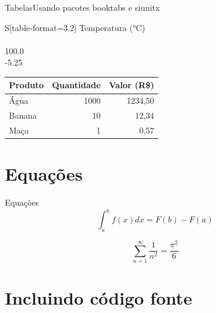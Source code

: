 \documentclass[aspectratio=169]{beamer}
\begin{document}
\begin{frame}{Tabelas}{Usando pacotes booktabs e siunitx}

    
    \begin{center}
    \begin{tabular}{S[table-format=3.2]}\toprule
        {Temperatura (\si{\celsius})} \\ \\
        100.0 \\
        -5.25 \\
        \bottomrule
    \end{tabular}
    \end{center}
    
    \begin{center}
        \begin{tabular}{l r r}\\\toprule
            Produto & Quantidade & Valor (R\$)  \\\midrule
            Água    &      1000  &  1234,50 \\ 
            Banana  &       10   &   12,34 \\
            Maça    &        1   &   0,57 \\ \bottomrule
        \end{tabular}
    \end{center}

\end{frame}


\section{Equações}



\begin{frame}{Equações}
\begin{equation}
    \int_a^b f(x) dx = F(b) - F(a)
\end{equation}

\begin{equation}
    \sum_{n=1}^{\infty} \frac{1}{n^2} = \frac{\pi^2}{6}
\end{equation}
\end{frame}

\section{Incluindo código fonte}
\end{document}
